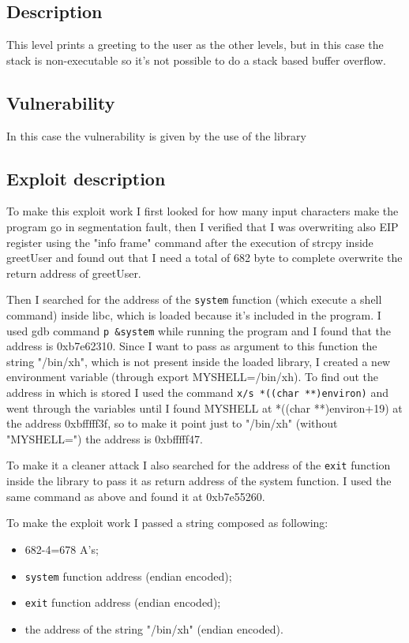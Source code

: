 \documentclass[a4paper,12pt]{article}
\begin{document}
\subsection{Description}

This level prints a greeting to the user as the other levels, but in this case the stack is non-executable so it's not possible to do a stack based buffer overflow.
\subsection{Vulnerability}

In this case the vulnerability is given by the use of the library 

\subsection{Exploit description} 

To make this exploit work I first looked for how many input characters make the program go in segmentation fault, then I verified that I was overwriting also EIP register using the "info frame" command after the execution of strcpy inside greetUser and found out that I need a total of 682 byte to complete overwrite the return address of greetUser.

Then I searched for the address of the \texttt{system} function (which execute a shell command) inside libc, which is loaded because it's included in the program. I used gdb command \texttt{p \&system} while running the program and I found that the address is 0xb7e62310. Since I want to pass as argument to this function the string "/bin/xh", which is not present inside the loaded library, I created a new environment variable (through export MYSHELL=/bin/xh).
 To find out the address in which is stored I used the command \texttt{x/s *((char **)environ)} and went through the variables until I found MYSHELL at   *((char **)environ+19) at the address 0xbfffff3f, so to make it point just to "/bin/xh" (without "MYSHELL=") the address is 0xbfffff47.
 
To make it a cleaner attack I also searched for the address of the \texttt{exit} function inside the library to pass it as return address of the system function. I used the same command as above and found it at 0xb7e55260.

To make the exploit work I passed a string composed as following:
\begin{itemize}
\item 682-4=678 A's;
\item \texttt{system} function address (endian encoded);
\item \texttt{exit} function address (endian encoded);
\item the address of the string "/bin/xh" (endian encoded).
\end{itemize}
\end{document}
